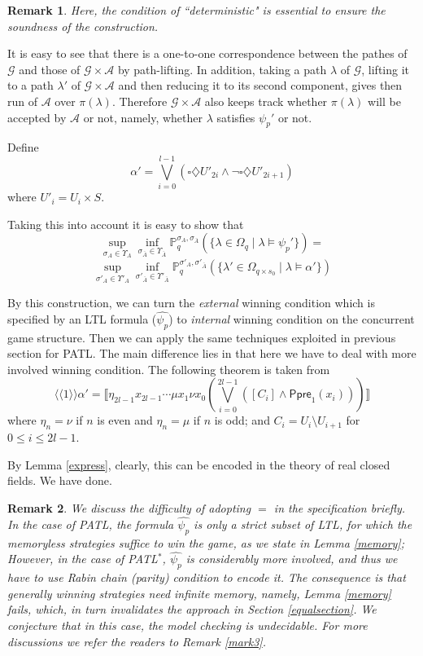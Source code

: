 \documentclass[times, 10 pt,twocolumn]{article}
\newtheorem{remark}{Remark}{\itshape}{\rm}
\newcommand{\mc}[1]{\mathcal{#1}}
\newcommand{\lla}{\langle\langle}
\newcommand{\rra}{\rangle\rangle}
\newcommand{\lb}{\llbracket}
\newcommand{\rb}{\rrbracket}
\newcommand{\Ppre}{\textsf{Ppre}}
\begin{document}
\begin{remark}
  Here, the condition of ``deterministic" is essential to ensure
  the soundness of the construction.
\end{remark}

It is easy to see that there is a one-to-one correspondence
between the pathes of $\mc{G}$ and those of $\mc{G}\times \mc{A}$
by path-lifting. In addition, taking a path $\lambda$ of $\mc{G}$,
lifting it to a path $\lambda'$ of $\mc{G}\times\mc{A}$ and then
reducing it to its second component, gives then run of $\mc{A}$
over $\pi(\lambda)$. Therefore $\mc{G}\times \mc{A}$ also keeps
track whether $\pi(\lambda)$ will be accepted by $\mc{A}$ or not,
namely, whether $\lambda$ satisfies $\psi_p'$ or not.

Define
\[\alpha'=\bigvee_{i=0}^{l-1}(\square\diamondsuit U'_{2i}\wedge \neg\square\diamondsuit
U'_{2i+1})\] where $U'_i=U_i\times S$.

Taking this into account it is easy to show that %
\[
\sup_{\sigma_A \in \Upsilon_A} \inf_{\sigma_{\bar{A}} \in
\Upsilon_{\bar{A}}} \mathbb{P}_q^{\sigma_A,
\sigma_{\bar{A}}}(\{\lambda\in \Omega_q \mid \lambda\models
\psi_p'\})=\]
\[
\sup_{\sigma'_A \in \Upsilon'_A} \inf_{\sigma'_{\bar{A}} \in
\Upsilon'_{\bar{A}}} \mathbb{P}_q^{\sigma'_A,
\sigma'_{\bar{A}}}(\{\lambda'\in \Omega_{q\times s_0} \mid
\lambda\models \alpha'\})\]


By this construction, we can turn the \emph{external} winning
condition which is specified by an LTL formula
($\widehat{\psi_p}$) to \emph{internal} winning condition on the
concurrent game structure.  Then we can apply the same techniques
exploited in previous section for PATL. The main difference lies
in that here we have to deal with more involved winning condition.
The following theorem is taken from \cite{deAM04}
\[
\lla 1\rra \alpha' = \lb \eta_{2l-1}x_{2l-1}\cdots \mu x_1\nu
x_0(\bigvee_{i=0}^{2l-1}([C_i]\wedge \Ppre_1(x_i)))\rb
\]
where $\eta_n=\nu$ if $n$ is even and $\eta_n=\mu$ if $n$ is odd;
and $C_i=U_i\setminus U_{i+1}$ for $0\leq i\leq 2l-1$.

By Lemma \ref{express}, clearly, this can be encoded in the theory
of real closed fields. We have done.
\begin{remark}
  We discuss the difficulty of adopting $=$ in the specification briefly. In the case
  of PATL, the formula $\widehat{\psi_p}$ is only a strict subset of LTL,
  for which the memoryless strategies suffice to win the game, as
  we state in Lemma \ref{memory}; However, in the case of
  PATL$^*$, $\widehat{\psi_p}$ is considerably more involved, and
  thus we have to use Rabin chain (parity) condition to encode it.
  The consequence is that generally winning strategies need infinite
  memory, namely, Lemma \ref{memory} fails, which, in turn invalidates the approach
  in Section \ref{equalsection}. We conjecture that in this case, the model checking
  is undecidable. For more discussions we refer the readers to Remark
  \ref{mark3}.
\end{remark}
\end{document}
